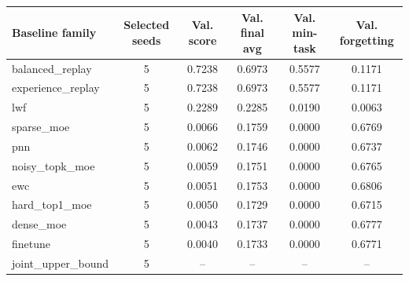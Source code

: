 \begin{tabularx}{\linewidth}{lccccc}
\toprule
Baseline family & Selected seeds & Val. score & Val. final avg & Val. min-task & Val. forgetting \\
\midrule
balanced\_replay & 5 & 0.7238 & 0.6973 & 0.5577 & 0.1171 \\
experience\_replay & 5 & 0.7238 & 0.6973 & 0.5577 & 0.1171 \\
lwf & 5 & 0.2289 & 0.2285 & 0.0190 & 0.0063 \\
sparse\_moe & 5 & 0.0066 & 0.1759 & 0.0000 & 0.6769 \\
pnn & 5 & 0.0062 & 0.1746 & 0.0000 & 0.6737 \\
noisy\_topk\_moe & 5 & 0.0059 & 0.1751 & 0.0000 & 0.6765 \\
ewc & 5 & 0.0051 & 0.1753 & 0.0000 & 0.6806 \\
hard\_top1\_moe & 5 & 0.0050 & 0.1729 & 0.0000 & 0.6715 \\
dense\_moe & 5 & 0.0043 & 0.1737 & 0.0000 & 0.6777 \\
finetune & 5 & 0.0040 & 0.1733 & 0.0000 & 0.6771 \\
joint\_upper\_bound & 5 & -- & -- & -- & -- \\
\bottomrule
\end{tabularx}